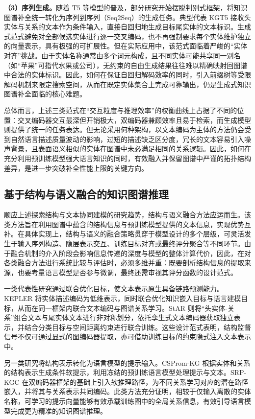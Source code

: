 \textbf{（3）序列生成。}随着 T5 等模型的普及，部分研究开始摆脱判别式框架，将知识图谱补全统一转化为序列到序列（Seq2Seq）的生成任务。典型代表 KGT5 接收头实体与关系的文本作为条件输入，直接自回归地生成目标尾实体的文本标识\cite{saxena2022sequence}。生成式范式避免对全部候选实体进行逐一交叉编码，也不再强制要求每个实体维护独立的向量表示，具有极强的可扩展性。但在实际应用中，该范式面临着严峻的“实体对齐”挑战。由于实体名称通常由多个词元构成，且不同实体可能共享同一别名（如“苹果”可指代水果或公司），无约束的自由生成结果往往难以精确映射回图谱中合法的实体标识。因此，如何在保证自回归解码效率的同时，引入前缀树等受限解码机制来限定搜索空间，从而在既定实体集合上完成可靠输出，仍是生成式知识图谱补全面临的核心难题。

总体而言，上述三类范式在“交互粒度与推理效率”的权衡曲线上占据了不同的位置：交叉编码器交互最深但开销极大，双编码器兼顾效率且易于检索，而生成模型则提供了统一的任务表达。但无论采用何种架构，以文本编码为主体的方法仍会受到自然语言描述质量波动的影响，过短的描述缺乏区分度，冗长的文本容易引入噪声背景，且表面语义相似的实体在图谱中未必满足相同的关系逻辑。因此，如何在充分利用预训练模型强大语言知识的同时，有效融入并保留图谱中严谨的拓扑结构差异，是进一步突破补全性能上限的关键方向。

\subsection{基于结构与语义融合的知识图谱推理}

顺应上述探索结构与文本协同建模的研究趋势，结构与语义融合方法应运而生。该类方法旨在利用图谱中蕴含的结构信息与预训练模型提供的文本信息，实现优势互补。在具体实现上，结构与语义的融合策略贯穿于模型设计的多个层级，可灵活发生于输入序列构造、隐层表示交互、训练目标对齐或最终评分聚合等不同环节。由于融合机制的介入阶段会影响信息传递的深度与模型的整体计算代价，因此，在对各类融合方法进行系统比较与评估时，必须多维并重：既要剖析结构信息的提取来源，也要考量语言模型是否参与微调，最终还需审视其评分函数的设计范式。

一类代表性研究通过联合优化目标，使文本表示原生具备链路预测能力。KEPLER 将实体描述编码为低维表示，同时联合优化知识嵌入目标与语言建模目标，从而在同一框架内联合文本编码与图谱关系学习\cite{wang2021kepler}。StAR 则将“头实体-关系”组合文本与尾实体文本进行非对称划分，依托孪生式文本编码器获取独立表示，并结合分类目标与空间距离约束进行联合训练\cite{wang2021structure}。这些设计范式表明，结构监督信号不仅可通过显式的图编码器提取，亦可借助训练目标的约束隐式注入文本表示中。

另一类研究将结构表示转化为语言模型的提示输入。CSProm-KG 根据实体和关系的结构表示生成条件软提示，利用冻结的预训练语言模型处理提示与文本\cite{chen2023cspromkg}。SRP-KGC 在双编码器框架的基础上引入软推理路径，为不同关系学习对应的潜在路径嵌入，并将其与关系表示共同编码\cite{hou2025srpkgc}。此类方法充分证明，相较于仅输入离散的实体名称，可学习的提示向量能够有效承载训练图中的全局关系信息，有效引导语言模型完成更为精准的知识图谱推理。

